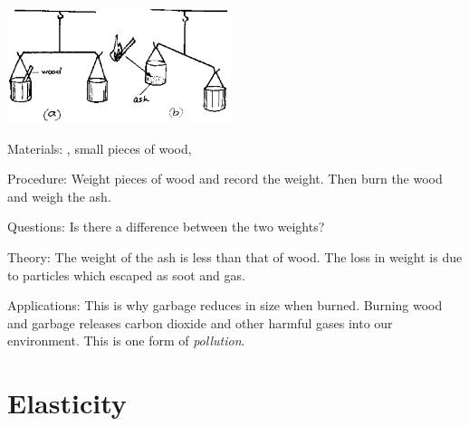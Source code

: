 \begin{multicols}{2}
\begin{center}
\includegraphics[width=0.49\textwidth]{./img/source/weighing-particles.png}
\end{center}

\begin{description*}
\item[Materials:]{, small pieces of wood, }
\item[Procedure:]{Weight pieces of wood and record the weight. Then burn the wood and weigh the ash.}
\item[Questions:]{Is there a difference between the two weights?}
\item[Theory:]{The weight of the ash is less than that of wood. The loss in weight is due to particles which escaped as soot and gas.}
\item[Applications:]{This is why garbage reduces in size when burned. Burning wood and garbage releases carbon dioxide and other harmful gases into our environment. This is one form of \emph{pollution}.}
\end{description*}


\section*{Elasticity} 



\end{multicols}
